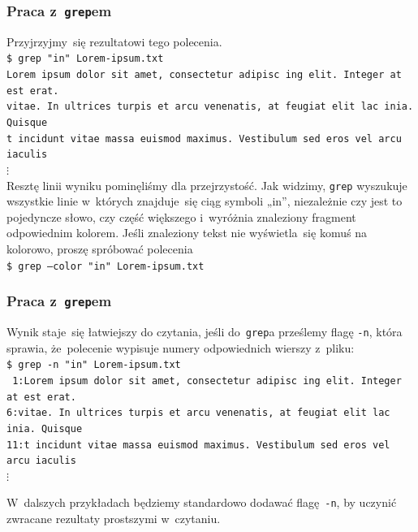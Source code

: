 \documentclass[10pt,t]{beamer}
\begin{document}
\begin{frame}
  \frametitle{Praca z~\texttt{grep}em}


  Przyjrzyjmy~się rezultatowi tego polecenia. \\
  \texttt{\$ grep "in"{} Lorem-ipsum.txt} \\
  \texttt{Lorem ipsum dolor sit amet, consectetur
    adipisc{\color{red} in}g elit. Integer at est erat.} \\
  \texttt{vitae. In ultrices turpis et arcu venenatis, at feugiat elit
    lac{\color{red} in}ia. Quisque} \\
  \texttt{t{\color{red} in}cidunt vitae massa euismod maximus. Vestibulum
    sed eros vel arcu iaculis} \\
  \hspace{1em} $\vdots$ \\
  Resztę linii wyniku pominęliśmy dla przejrzystość. Jak widzimy,
  \texttt{grep} wyszukuje wszystkie linie w~których znajduje~się ciąg
  symboli „in”, niezależnie czy jest to pojedyncze słowo, czy część
  większego i~wyróżnia znaleziony fragment odpowiednim kolorem. Jeśli
  znaleziony tekst nie wyświetla~się komuś na kolorowo, proszę spróbować
  polecenia \\
  \texttt{\$ grep --color "in"{} Lorem-ipsum.txt}

\end{frame}





\begin{frame}
  \frametitle{Praca z~\texttt{grep}em}


  Wynik staje~się łatwiejszy do czytania, jeśli do~\texttt{grep}a prześlemy
  flagę \texttt{-n}, która sprawia, że~polecenie wypisuje numery
  odpowiednich wierszy z~pliku: \\
  \texttt{\$ grep -n "in"{} Lorem-ipsum.txt} \\
  \texttt{{\color{green} 1:}Lorem ipsum dolor sit amet, consectetur
    adipisc{\color{red} in}g elit. Integer at est erat.} \\
  \texttt{{\color{green}6:}vitae. In ultrices turpis et arcu venenatis, at
    feugiat elit lac{\color{red} in}ia. Quisque} \\
  \texttt{{\color{green}11:}t{\color{red} in}cidunt vitae massa euismod
    maximus. Vestibulum sed eros vel arcu iaculis} \\
  \hspace{1em} $\vdots$

  W~dalszych przykładach będziemy standardowo dodawać flagę~\texttt{-n}, by
  uczynić zwracane rezultaty prostszymi w~czytaniu.

\end{frame}
\end{document}
